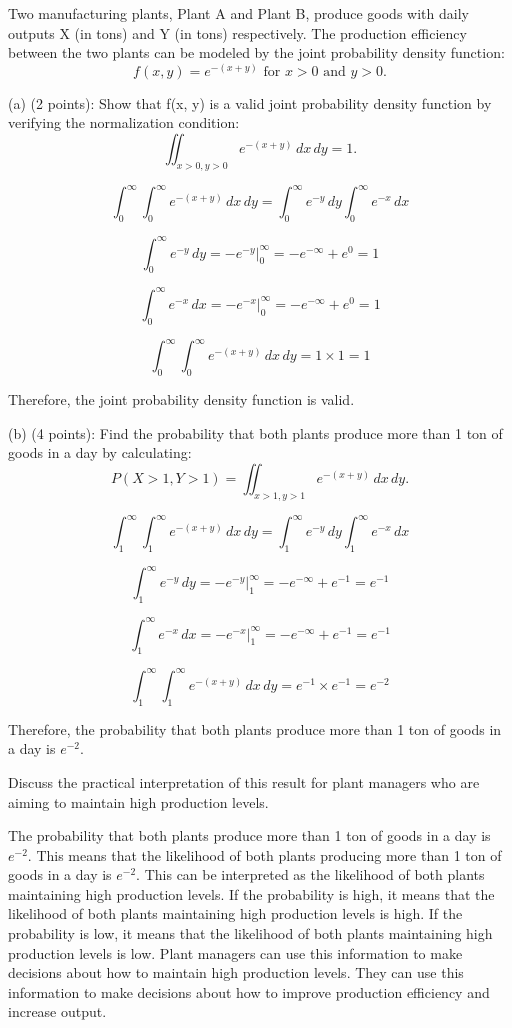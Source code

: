 \documentclass{article}
\begin{document}
Two manufacturing plants, Plant A and Plant B, produce goods with daily outputs X (in tons) and Y (in tons) respectively. The production efficiency between the two plants can be modeled by the joint probability density function:
\[f(x, y) = e^{-(x+y)} \text{ for } x > 0 \text{ and } y > 0.\]

(a) (2 points): Show that f(x, y) is a valid joint probability density function by verifying the
normalization condition:
\[\iint_{x > 0, y > 0} e^{-(x+y)} \, dx \, dy = 1.\]

\[\int_{0}^{\infty}\int_{0}^{\infty}e^{-(x+y)} \, dx \, dy = \int_{0}^{\infty}e^{-y} \, dy \int_{0}^{\infty}e^{-x} \, dx\]

\[\int_{0}^{\infty}e^{-y} \, dy = -e^{-y}\Big|_{0}^{\infty} = -e^{-\infty} + e^{0} = 1\]

\[\int_{0}^{\infty}e^{-x} \, dx = -e^{-x}\Big|_{0}^{\infty} = -e^{-\infty} + e^{0} = 1\]

\[\int_{0}^{\infty}\int_{0}^{\infty}e^{-(x+y)} \, dx \, dy = 1 \times 1 = 1\]

Therefore, the joint probability density function is valid.

(b) (4 points): Find the probability that both plants produce more than 1 ton of goods in a day
by calculating:
\[
P(X > 1, Y > 1) =
\iint_{x > 1, y > 1} e^{-(x+y)} \, dx \, dy.
\]

\[\int_{1}^{\infty}\int_{1}^{\infty}e^{-(x+y)} \, dx \, dy = \int_{1}^{\infty}e^{-y} \, dy \int_{1}^{\infty}e^{-x} \, dx\]

\[\int_{1}^{\infty}e^{-y} \, dy = -e^{-y}\Big|_{1}^{\infty} = -e^{-\infty} + e^{-1} = e^{-1}\]

\[\int_{1}^{\infty}e^{-x} \, dx = -e^{-x}\Big|_{1}^{\infty} = -e^{-\infty} + e^{-1} = e^{-1}\]

\[\int_{1}^{\infty}\int_{1}^{\infty}e^{-(x+y)} \, dx \, dy = e^{-1} \times e^{-1} = e^{-2}\]

Therefore, the probability that both plants produce more than 1 ton of goods in a day is \(e^{-2}\).

Discuss the practical interpretation of this result for plant managers who are aiming to maintain
high production levels.

The probability that both plants produce more than 1 ton of goods in a day is \(e^{-2}\). This means that the likelihood of both plants producing more than 1 ton of goods in a day is \(e^{-2}\). This can be interpreted as the likelihood of both plants maintaining high production levels. If the probability is high, it means that the likelihood of both plants maintaining high production levels is high. If the probability is low, it means that the likelihood of both plants maintaining high production levels is low. Plant managers can use this information to make decisions about how to maintain high production levels. They can use this information to make decisions about how to improve production efficiency and increase output.\newline
\end{document}

